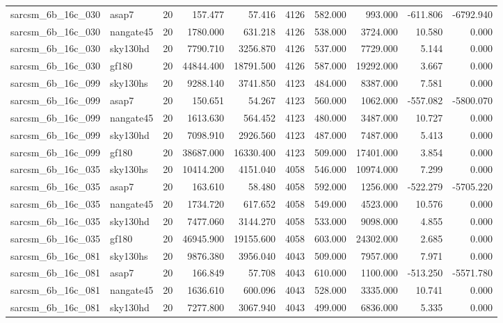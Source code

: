 \documentclass{article}
\begin{document}
\begin{longtable}{llrrrrrrrr}
sarcsm\_6b\_16c\_030 & asap7 & 20 & 157.477 & 57.416 & 4126 & 582.000 & 993.000 & -611.806 & -6792.940 \\
sarcsm\_6b\_16c\_030 & nangate45 & 20 & 1780.000 & 631.218 & 4126 & 538.000 & 3724.000 & 10.580 & 0.000 \\
sarcsm\_6b\_16c\_030 & sky130hd & 20 & 7790.710 & 3256.870 & 4126 & 537.000 & 7729.000 & 5.144 & 0.000 \\
sarcsm\_6b\_16c\_030 & gf180 & 20 & 44844.400 & 18791.500 & 4126 & 587.000 & 19292.000 & 3.667 & 0.000 \\
sarcsm\_6b\_16c\_099 & sky130hs & 20 & 9288.140 & 3741.850 & 4123 & 484.000 & 8387.000 & 7.581 & 0.000 \\
sarcsm\_6b\_16c\_099 & asap7 & 20 & 150.651 & 54.267 & 4123 & 560.000 & 1062.000 & -557.082 & -5800.070 \\
sarcsm\_6b\_16c\_099 & nangate45 & 20 & 1613.630 & 564.452 & 4123 & 480.000 & 3487.000 & 10.727 & 0.000 \\
sarcsm\_6b\_16c\_099 & sky130hd & 20 & 7098.910 & 2926.560 & 4123 & 487.000 & 7487.000 & 5.413 & 0.000 \\
sarcsm\_6b\_16c\_099 & gf180 & 20 & 38687.000 & 16330.400 & 4123 & 509.000 & 17401.000 & 3.854 & 0.000 \\
sarcsm\_6b\_16c\_035 & sky130hs & 20 & 10414.200 & 4151.040 & 4058 & 546.000 & 10974.000 & 7.299 & 0.000 \\
sarcsm\_6b\_16c\_035 & asap7 & 20 & 163.610 & 58.480 & 4058 & 592.000 & 1256.000 & -522.279 & -5705.220 \\
sarcsm\_6b\_16c\_035 & nangate45 & 20 & 1734.720 & 617.652 & 4058 & 549.000 & 4523.000 & 10.576 & 0.000 \\
sarcsm\_6b\_16c\_035 & sky130hd & 20 & 7477.060 & 3144.270 & 4058 & 533.000 & 9098.000 & 4.855 & 0.000 \\
sarcsm\_6b\_16c\_035 & gf180 & 20 & 46945.900 & 19155.600 & 4058 & 603.000 & 24302.000 & 2.685 & 0.000 \\
sarcsm\_6b\_16c\_081 & sky130hs & 20 & 9876.380 & 3956.040 & 4043 & 509.000 & 7957.000 & 7.971 & 0.000 \\
sarcsm\_6b\_16c\_081 & asap7 & 20 & 166.849 & 57.708 & 4043 & 610.000 & 1100.000 & -513.250 & -5571.780 \\
sarcsm\_6b\_16c\_081 & nangate45 & 20 & 1636.610 & 600.096 & 4043 & 528.000 & 3335.000 & 10.741 & 0.000 \\
sarcsm\_6b\_16c\_081 & sky130hd & 20 & 7277.800 & 3067.940 & 4043 & 499.000 & 6836.000 & 5.335 & 0.000 \\

\end{longtable}
\end{document}
